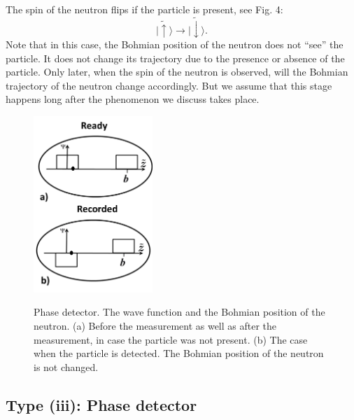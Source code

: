 \documentclass[12pt,preprint,tightenlines]{elsarticle}
\begin{document}
 The spin of the neutron flips if the particle
is present, see Fig. 4:
 \begin{equation}
|\tilde{\uparrow}\rangle\rightarrow|\tilde{\downarrow}\rangle.\label{spindet}
\end{equation}
 Note that in this case, the Bohmian position of the neutron does not ``see''
the particle. It does not change its trajectory due to the presence
or absence of the particle. Only later, when the spin of the neutron
is observed, will the Bohmian trajectory of the neutron change
accordingly. But we assume that this stage happens long after the
phenomenon we discuss takes place.


\begin{figure}[h]
  \includegraphics[width=4.5cm]{5.pdf}\\  \vspace{-6pt}
    \caption{ Phase detector.   The wave function and the Bohmian position of the neutron. (a)  Before the measurement as well as after the measurement, in case the particle was not present. (b) The case when the particle is detected.  The Bohmian position of the neutron is not changed.}
\end{figure}

\subsection{ Type {\rm (iii)}: Phase detector}
\end{document}
